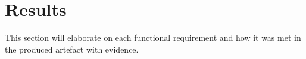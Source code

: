 \section{Results}
This section will elaborate on each functional requirement and how it was met in the produced artefact with 
evidence.
